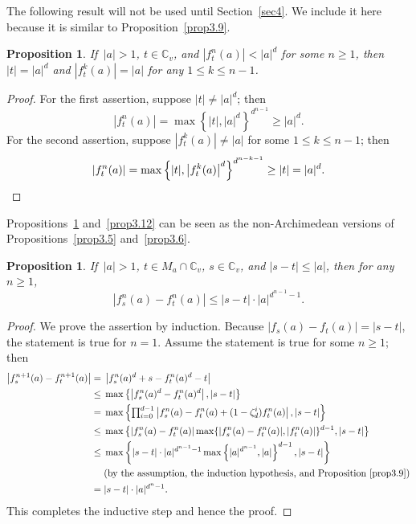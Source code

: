 \documentclass[11pt]{amsart}
\numberwithin{equation}{section}
\theoremstyle{plain}
\newtheorem{prop}[thm]{Proposition}
\theoremstyle{definition}
\theoremstyle{remark}
\newcommand{\C}{\mathbb C}
\begin{document}
The following result will not be used until Section~\ref{sec4}. We
include it here because it is similar to Proposition~\ref{prop3.9}.

\begin{prop}\label{prop3.10}
If\, $|a|>1$, $t\in\C_{v}$, and $|f_{t}^{n}(a)|<|a|^{d}$
for some $n\geq1$, then $|t|=|a|^{d}$ and $|f_{t}^{k}(a)|=|a|$
for any $1\leq k\leq n-1$.
\end{prop}

\begin{proof}
For the first assertion, suppose $|t|\neq|a|^{d}$; then
\[
|f_{t}^{n}(a)|=\max\left\{|t|,|a|^{d}\right\}^{d^{n-1}}\geq|a|^{d}.
\]
For the second assertion, suppose $|f_{t}^{k}(a)|\neq|a|$ for some
$1\leq k\leq n-1$; then
\[
|f_{t}^{n}(a)|=\max\left\{|t|,\left|f_{t}^{k}(a)\right|^{d}\right\}^{d^{n-k-1}}\geq|t|=|a|^{d}.\qedhere
\]
\end{proof}

Propositions~\ref{prop3.11} and~\ref{prop3.12} can be seen as the
non-Archimedean versions of Propositions~\ref{prop3.5} and~\ref{prop3.6}.

\begin{prop}\label{prop3.11}
If\, $|a|>1$, $t\in M_{a}\cap\C_{v}$, $s\in\C_{v}$, and $|s-t|\leq|a|$, then 
for any $n\geq1$, 
\[
|f_{s}^{n}(a)-f_{t}^{n}(a)|\leq|s-t|\cdot|a|^{d^{n-1}-1}. 
\]
\end{prop}

\begin{proof}
We prove the assertion by induction. Because $|f_{s}(a)-f_{t}(a)|=|s-t|$,
the statement is true for $n=1$. Assume the statement is true for
some $n\geq1$; then
\allowdisplaybreaks
\begin{align*}
 \left|f_{s}^{n+1}(a)-f_{t}^{n+1}(a)\right|
=\; & \left|f_{s}^{n}(a)^{d}+s-f_{t}^{n}(a)^{d}-t\right|\\
\leq\; & \max\left\{\left|f_{s}^{n}(a)^{d}-f_{t}^{n}(a)^{d}\right|,|s-t|\right\}\\
=\; & \max\left\{{\textstyle \prod_{i=0}^{d-1}}\left|f_{s}^{n}(a)-f_{t}^{n}(a)+(1-\zeta_{d}^{i})f_{t}^{n}(a)\right|,|s-t|\right\}\\
\leq\; & \max\left\{|f_{s}^{n}(a)-f_{t}^{n}(a)|\max\{|f_{s}^{n}(a)-f_{t}^{n}(a)|,|f_{t}^{n}(a)|\}^{d-1},|s-t|\right\}\\
\leq\; & \max\left\{|s-t|\cdot|a|^{d^{n-1}-1}\max\left\{|a|^{d^{n-1}},|a|\right\}^{d-1},|s-t|\right\}\\
 & \text{(by the assumption, the induction hypothesis, and Proposition~\ref{prop3.9})}\\
=\; & |s-t|\cdot|a|^{d^{n}-1}.
\end{align*}
This completes the inductive step and hence the proof.
\end{proof}
\end{document}
